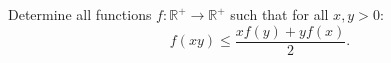 Determine all functions $f\colon\mathbb{R}^+ \rightarrow \mathbb{R}^+$ such that for all $x,y >0$:
$$f(xy) \leq \frac{xf(y)+yf(x)}{2}.$$
